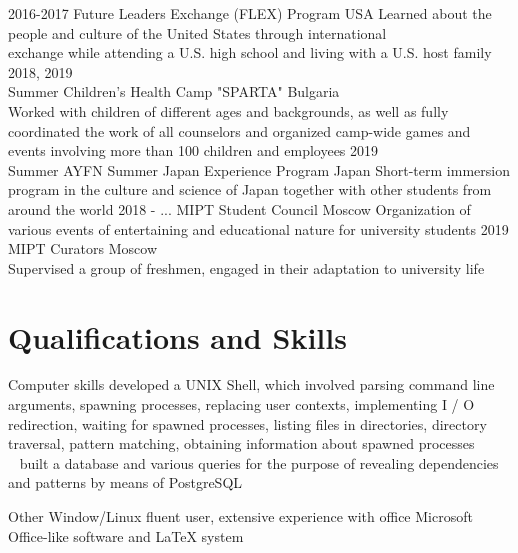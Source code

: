 \documentclass[]{cv-style}          %
\begin{document}
\begin{entrylist}
\entry
  {2016-2017}
  {Future Leaders Exchange (FLEX) Program}
  {USA}
  {Learned about the people and culture of the United States through international \\ exchange while attending a U.S. high school and living with a U.S. host family}
\entry
  {2018, 2019 \\ Summer}
  {Children's Health Camp "SPARTA"}
  {Bulgaria}
  {\\
  Worked with children of different ages and backgrounds, as well as fully coordinated the work of all counselors and organized camp-wide games and events involving more than 100 children and employees }
\entry
  {2019 \\ Summer}
  {AYFN Summer Japan Experience Program}
  {Japan}
  {Short-term immersion program in the culture and science of Japan together with other students from around the world}
\entry
  {2018 - ...}
  {MIPT Student Council}
  {Moscow}
  {Organization of various events of entertaining and educational nature for university students}
\entry
  {2019}
  {MIPT Curators}
  {Moscow}
  {\\
  Supervised a group of freshmen, engaged in their adaptation to university life}
\end{entrylist}


\section{Qualifications and Skills}
  \vspace{-0.2cm}

\begin{entrylist}
\entry
  {}
  {Computer skills }
  {}
  { developed a UNIX Shell, which involved parsing command line arguments, spawning processes, replacing user contexts, implementing I / O redirection, waiting for spawned processes, listing files in directories, directory traversal, pattern matching, obtaining information about spawned processes \vspace{+0.2cm} \\\  
    built a database and various queries for the purpose of revealing dependencies and patterns by means of PostgreSQL}
  
  \entry
  {}
  {Other}
  {}
  {Window/Linux fluent user, extensive experience with office Microsoft Office-like software and \LaTeX{} system \\\\}

\end{entrylist}
\end{document}
